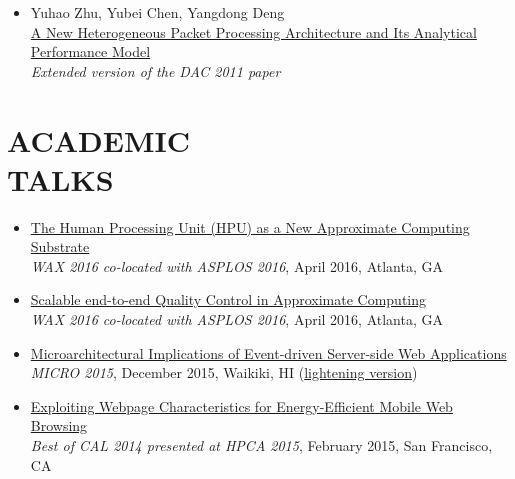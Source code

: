 \documentclass[margin, 9pt]{res} %
\begin{document}
\begin{resume}
\begin{itemize}[leftmargin=*]
	\item Yuhao Zhu, Yubei Chen, Yangdong Deng\\
          \href{http://yuhaozhu.com/pubs/tr12.pdf}{A New Heterogeneous Packet Processing Architecture and Its Analytical Performance Model}\\
          \textit{Extended version of the DAC 2011 paper}
\end{itemize}

 
\section{ACADEMIC\\ TALKS}

\vspace*{-2pt}
\begin{itemize}[leftmargin=*] \itemsep 0pt
	\item \href{https://speakerdeck.com/queeten/the-human-processing-unit-hpu-as-a-new-approximate-computing-substrate}{The Human Processing Unit (HPU) as a New Approximate Computing Substrate}\\[2pt]
          \textit{WAX 2016 co-located with ASPLOS 2016}, April 2016, Atlanta, GA

	\item \href{https://speakerdeck.com/queeten/end-to-end-quality-control-in-approximate-computing}{Scalable end-to-end Quality Control in Approximate Computing}\\[2pt]
          \textit{WAX 2016 co-located with ASPLOS 2016}, April 2016, Atlanta, GA

	\item \href{https://speakerdeck.com/queeten/microarchitectural-implications-of-event-driven-server-side-web-applications}{Microarchitectural Implications of Event-driven Server-side Web Applications}\\[2pt]
          \textit{MICRO 2015}, December 2015, Waikiki, HI (\href{https://speakerdeck.com/queeten/micro-2015-lightning-session-talk}{lightening version})

	\item \href{https://speakerdeck.com/queeten/exploiting-webpage-characteristics-for-energy-efficient-mobile-web-browsing}{Exploiting Webpage Characteristics for Energy-Efficient Mobile Web Browsing}\\[2pt]
          \textit{Best of CAL 2014 presented at HPCA 2015}, February 2015, San Francisco, CA


\end{itemize}
\end{resume}
\end{document}
